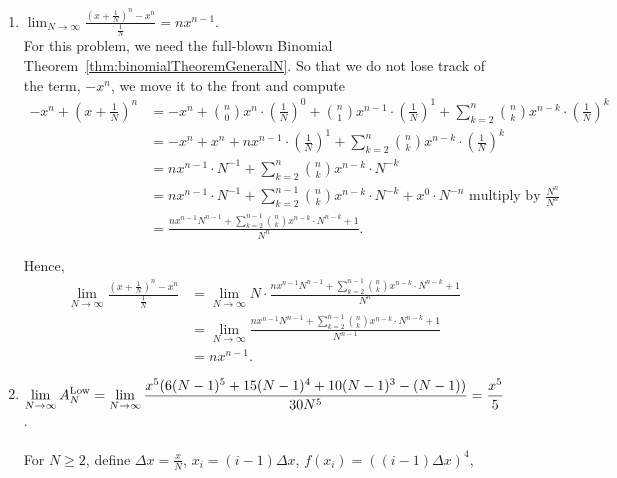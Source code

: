 \begin{enumerate}
      \item  \Ans $\displaystyle\lim_{N \to \infty} \frac{(x + \frac{1}{N})^n - x^n}{\frac{1}{N}} = n x^{n-1}$.\\

      For this problem, we need the full-blown Binomial Theorem~\ref{thm:binomialTheoremGeneralN}. So that we do not lose track of the term, $-x^n$, we move it to the front and compute
                 \begin{align*}
         -x^n + (x + \frac{1}{N})^n  & = -x^n + \binom{n}{0} x^n \cdot \left( \frac{1}{N}\right)^0 +  \binom{n}{1} x^{n-1} \cdot \left(\frac{1}{N} \right)^1 + \sum_{k=2}^{n}  \binom{n}{k} x^{n-k} \cdot \left(\frac{1}{N} \right)^k \\
         &= -x^n +  x^n  +  n x^{n-1} \cdot \left(\frac{1}{N} \right)^1 + \sum_{k=2}^{n}  \binom{n}{k} x^{n-k} \cdot \left(\frac{1}{N} \right)^k \\
         & =  n x^{n-1} \cdot N^{-1} + \sum_{k=2}^{n}  \binom{n}{k} x^{n-k} \cdot N^{-k} \\
         & = n x^{n-1} \cdot N^{-1} + \sum_{k=2}^{n-1}  \binom{n}{k} x^{n-k} \cdot N^{-k} + x^0 \cdot N^{-n}\text{ multiply by } \frac{N^n}{N^n}\\
         & = \frac{ n x^{n-1} N^{n-1} + \sum_{k=2}^{n-1}  \binom{n}{k} x^{n-k} \cdot N^{n-k}  +  1}{N^n}.
     \end{align*}

 Hence, 
         \begin{align*}
        \displaystyle\lim_{N \to \infty} \frac{(x + \frac{1}{N})^n - x^n}{\frac{1}{N}} & =  \displaystyle\lim_{N \to \infty} N \cdot \frac{ n x^{n-1} N^{n-1} + \sum_{k=2}^{n-1}  \binom{n}{k} x^{n-k} \cdot N^{n-k}  +  1}{N^n} \\
        &= \displaystyle\lim_{N \to \infty}\frac{ n x^{n-1} N^{n-1} + \sum_{k=2}^{n-1}  \binom{n}{k} x^{n-k} \cdot N^{n-k}  +  1}{N^{n-1} } \\
        & = n x^{n-1}.
    \end{align*}
     

      \item \Ans $\displaystyle\lim_{N \to \infty} A^{\rm Low}_N = \displaystyle\lim_{N \to \infty} \frac{x^5(6(N-1)^5+15(N-1)^4+10(N-1)^3-(N-1)) }{30 N^5} = \frac{x^5}{5}$.\\ \\

     

For $N \ge 2$, define $\Delta x =\frac{x}{N}$, $x_i = (i-1) \Delta x$, $f(x_i)= \left((i-1) \Delta x \right)^4$,


\end{enumerate}
